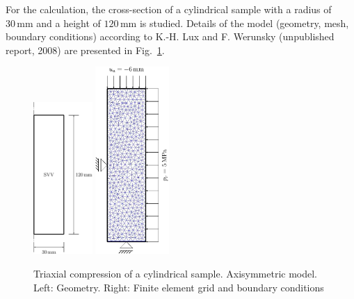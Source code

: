 For the calculation, the cross-section of a cylindrical sample with a radius of $30\,\mbox{mm}$ and a height of $120\,\mbox{mm}$ is studied. Details of the model (geometry, mesh, boundary conditions) according to K.-H. Lux and F. Werunsky (unpublished report, 2008) are presented in Fig.~\ref{Me_triax_model_lubby1}.
\begin{figure}[!htb]
\begin{center}
\includegraphics[width=0.2\textwidth]{PART_II/M/svv_model.eps}
\hspace*{10.0ex}
\includegraphics[width=0.25\textwidth]{PART_II/M/svv_mesh.eps}
\end{center}
\caption{Triaxial compression of a cylindrical sample. Axisymmetric model. Left: Geometry. Right: Finite element grid and boundary conditions} 
\label{Me_triax_model_lubby1}
\end{figure}

